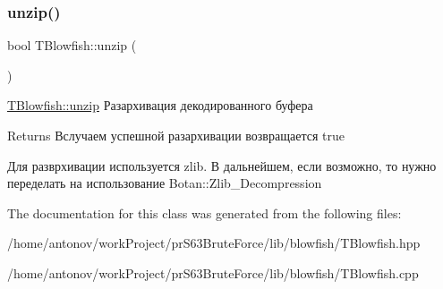 \subsubsection{\texorpdfstring{unzip()}{unzip()}}
{\footnotesize\ttfamily bool T\+Blowfish\+::unzip (\begin{DoxyParamCaption}{ }\end{DoxyParamCaption})}



\hyperlink{classblowfish_lib_1_1_t_blowfish_a17896279118b13a237ab31c1cb82da26}{T\+Blowfish\+::unzip} Разархивация декодированного буфера 

\begin{DoxyReturn}{Returns}
Вслучаем успешной разархивации возвращается true
\end{DoxyReturn}
Для разврхивации используется zlib. В дальнейшем, если возможно, то нужно переделать на использование Botan\+::\+Zlib\+\_\+\+Decompression 

The documentation for this class was generated from the following files\+:\begin{DoxyCompactItemize}
\item 
/home/antonov/work\+Project/pr\+S63\+Brute\+Force/lib/blowfish/T\+Blowfish.\+hpp\item 
/home/antonov/work\+Project/pr\+S63\+Brute\+Force/lib/blowfish/T\+Blowfish.\+cpp\end{DoxyCompactItemize}
